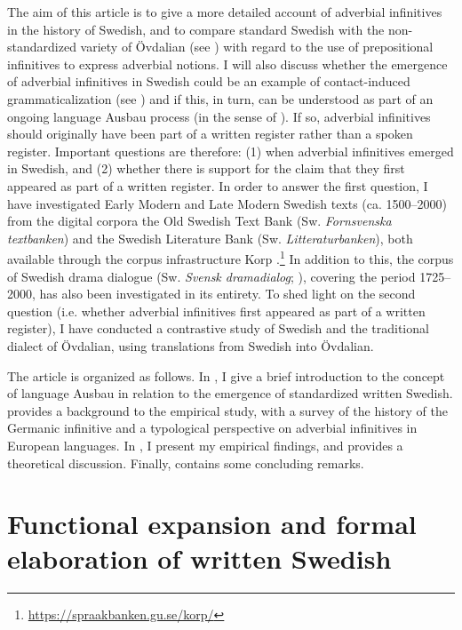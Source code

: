 \documentclass[output=paper]{langscibook}
\begin{document}
The aim of this article is to give a more detailed account of adverbial infinitives in the history of Swedish, and to compare standard Swedish with the non-standardized variety of Övdalian (see ) with regard to the use of prepositional infinitives to express adverbial notions. I will also discuss whether the emergence of adverbial infinitives in Swedish could be an example of contact-induced grammaticalization (see \citealt{HeineKuteva2003, HeineKuteva2005}) and if this, in turn, can be understood as part of an ongoing language Ausbau process (in the sense of \citealt{Kloss1967}). If so, adverbial infinitives should originally have been part of a written register rather than a spoken register. Important questions are therefore: (1) when adverbial infinitives emerged in Swedish, and (2) whether there is support for the claim that they first appeared as part of a written register. In order to answer the first question, I have investigated Early Modern and Late Modern Swedish texts (ca. 1500–2000) from the digital corpora the Old Swedish Text Bank (Sw. \textit{Fornsvenska textbanken}) and the Swedish Literature Bank (Sw. \textit{Litteraturbanken}), both available through the corpus infrastructure Korp \citep{BorinEtAl2012}.\footnote{\url{https://spraakbanken.gu.se/korp/}}  In addition to this, the corpus of Swedish drama dialogue (Sw. \textit{Svensk dramadialog}; \citealt{MarttalaStromquist2001}), covering the period 1725–2000, has also been investigated in its entirety. To shed light on the second question (i.e. whether adverbial infinitives first appeared as part of a written register), I have conducted a contrastive study of Swedish and the traditional dialect of Övdalian, using translations from Swedish into Övdalian.



The article is organized as follows. In , I give a brief introduction to the concept of language Ausbau in relation to the emergence of standardized written Swedish.  provides a background to the empirical study, with a survey of the history of the Germanic infinitive and a typological perspective on adverbial infinitives in European languages. In , I present my empirical findings, and  provides a theoretical discussion. Finally,  contains some concluding remarks. 


\section{Functional expansion and formal elaboration of written Swedish}\label{sec:kalm:2}
\end{document}
